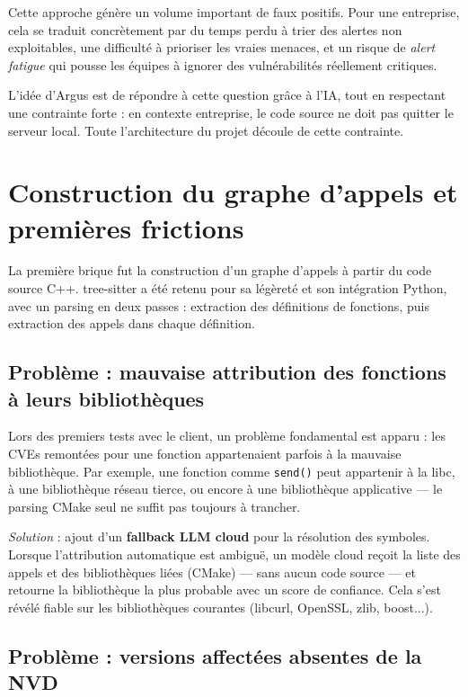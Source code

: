 \documentclass[a4paper, 12pt, hidelinks]{article}
\begin{document}
Cette approche génère un volume important de faux positifs. Pour une entreprise, 
cela se traduit concrètement par du temps perdu à trier des alertes non exploitables, 
une difficulté à prioriser les vraies menaces, et un risque de \textit{alert fatigue} 
qui pousse les équipes à ignorer des vulnérabilités réellement critiques.

L'idée d'Argus est de répondre à cette question grâce à l'IA, tout en respectant 
une contrainte forte : en contexte entreprise, le code source ne doit pas quitter 
le serveur local. Toute l'architecture du projet découle de cette contrainte.

\section{Construction du graphe d'appels et premières frictions}

La première brique fut la construction d'un graphe d'appels à partir du code source C++. tree-sitter a été retenu pour sa légèreté et son intégration Python, avec un parsing en deux passes : extraction des définitions de fonctions, puis extraction des appels dans chaque définition.

\subsection*{Problème : mauvaise attribution des fonctions à leurs bibliothèques}

Lors des premiers tests avec le client, un problème fondamental est apparu : les CVEs remontées pour une fonction appartenaient parfois à la mauvaise bibliothèque. Par exemple, une fonction comme \texttt{send()} peut appartenir à la libc, à une bibliothèque réseau tierce, ou encore à une bibliothèque applicative — le parsing CMake seul ne suffit pas toujours à trancher.

\textit{Solution} : ajout d'un \textbf{fallback LLM cloud} pour la résolution des symboles. Lorsque l'attribution automatique est ambiguë, un modèle cloud reçoit la liste des appels et des bibliothèques liées (CMake) — sans aucun code source — et retourne la bibliothèque la plus probable avec un score de confiance. Cela s'est révélé fiable sur les bibliothèques courantes (libcurl, OpenSSL, zlib, boost...).

\subsection*{Problème : versions affectées absentes de la NVD}
\end{document}
